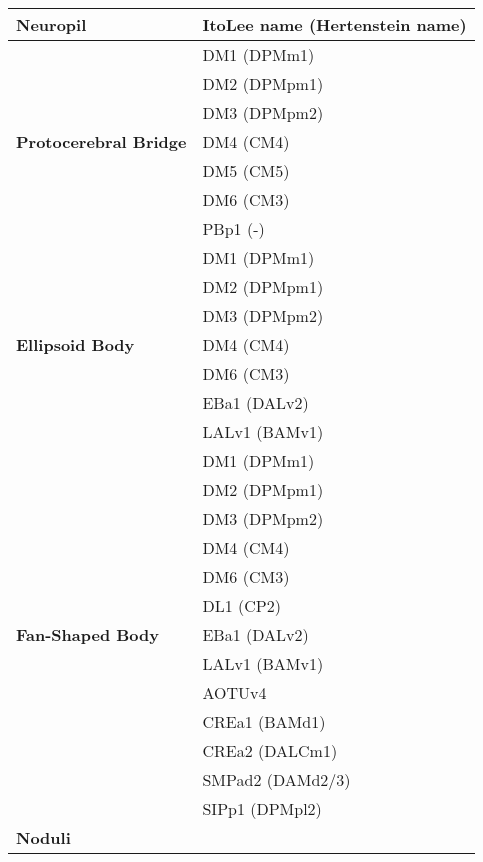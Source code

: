         \begin{table}[ht]
        \centering
        \begin{tabular}{l|l}
            \toprule
            \textbf{Neuropil} & \textbf{ItoLee name (Hertenstein name)} \\
            \midrule
            \multirow{7}{*}{\textbf{Protocerebral Bridge}} 
                & DM1 (DPMm1) \\
                & DM2 (DPMpm1) \\
                & DM3 (DPMpm2) \\
                & DM4 (CM4) \\
                & DM5 (CM5) \\
                & DM6 (CM3) \\
                & PBp1 (-) \\
            \midrule
            \multirow{7}{*}{\textbf{Ellipsoid Body}} 
                & DM1 (DPMm1) \\
                & DM2 (DPMpm1) \\
                & DM3 (DPMpm2) \\
                & DM4 (CM4) \\
                & DM6 (CM3) \\
                & EBa1 (DALv2) \\
                & LALv1 (BAMv1) \\
            \midrule
            \multirow{13}{*}{\textbf{Fan-Shaped Body}} 
                & DM1 (DPMm1) \\
                & DM2 (DPMpm1) \\
                & DM3 (DPMpm2) \\
                & DM4 (CM4) \\
                & DM6 (CM3) \\
                & DL1 (CP2) \\
                & EBa1 (DALv2) \\
                & LALv1 (BAMv1) \\
                & AOTUv4 \\
                & CREa1 (BAMd1) \\
                & CREa2 (DALCm1) \\
                & SMPad2 (DAMd2/3) \\
                & SIPp1 (DPMpl2) \\
            \midrule
            \multirow{7}{*}{\textbf{Noduli}} 

\end{tabular}
\end{table}
